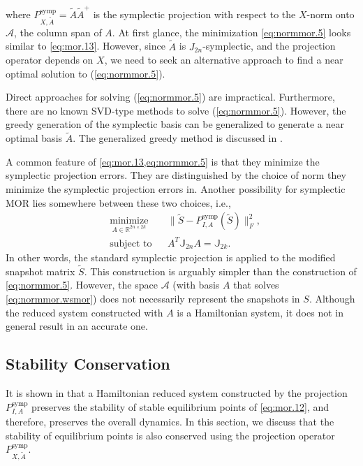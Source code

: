 where $P^\text{symp}_{X,\tilde A} = \tilde A \tilde A^+$ is the symplectic projection with respect to the $X$-norm onto $\mathcal A$, the column span of $A$. At first glance, the minimization \eqref{eq:normmor.5} looks similar to \eqref{eq:mor.13}. However, since $\tilde A$ is $J_{2n}$-symplectic, and the projection operator depends on $X$, we need to seek an alternative approach to find a near optimal solution to (\ref{eq:normmor.5}). 

Direct approaches for solving (\ref{eq:normmor.5}) are impractical. Furthermore, there are no known SVD-type methods to solve (\ref{eq:normmor.5}). However, the greedy generation of the symplectic basis can be generalized to generate a near optimal basis $\tilde A$. The generalized greedy method is discussed in .

\begin{rem}
A common feature of \cref{eq:mor.13,eq:normmor.5} is that they minimize the symplectic projection errors. They are distinguished by the choice of norm they minimize the symplectic projection errors in. Another possibility for symplectic MOR lies somewhere between these two choices, i.e.,
\begin{equation} \label{eq:normmor.wsmor}
\begin{aligned}
& \underset{ A\in \mathbb{R}^{2n\times 2k}}{\text{minimize}}
& & \| \tilde S - P^\text{symp}_{I, A}(\tilde S) \|_F^2, \\
& \text{subject to}
& & A^T \mathbb J_{2n} A = \mathbb J_{2k}.
\end{aligned}
\end{equation}
In other words, the standard symplectic projection is applied to the modified snapshot matrix $\tilde S$. This construction is arguably simpler than the construction of \cref{eq:normmor.5}. However, the space $\mathcal A$ (with basis $A$ that solves \eqref{eq:normmor.wsmor}) does not necessarily represent the snapshots in $S$. Although the reduced system constructed with $A$ is a Hamiltonian system, it does not in general result in an accurate one.
\end{rem}

\subsection{Stability Conservation} It is shown in \cite{doi:10.1137/140978922,doi:10.1137/17M1111991} that a Hamiltonian reduced system constructed by the projection $P^{\text{symp}}_{I,A}$ preserves the stability of stable equilibrium points of \cref{eq:mor.12}, and therefore, preserves the overall dynamics. In this section, we discuss that the stability of equilibrium points is also conserved using the projection operator $P^{\text{symp}}_{X,\tilde A}$.

